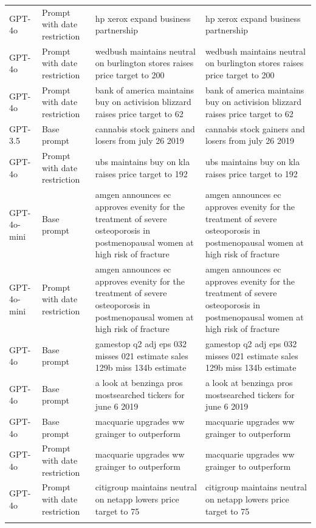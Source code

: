 \begin{longtable}{>{\raggedright\arraybackslash}p{1.4cm}>{\raggedright\arraybackslash}p{1.4cm}>{\raggedright\arraybackslash}p{5.5cm}>{\raggedright\arraybackslash}p{5.5cm}}
GPT-4o & Prompt with date restriction & hp xerox expand business partnership & hp xerox expand business partnership\\
GPT-4o & Prompt with date restriction & wedbush maintains neutral on burlington stores raises price target to 200 & wedbush maintains neutral on burlington stores raises price target to 200\\
GPT-4o & Prompt with date restriction & bank of america maintains buy on activision blizzard raises price target to 62 & bank of america maintains buy on activision blizzard raises price target to 62\\
GPT-3.5 & Base prompt & cannabis stock gainers and losers from july 26 2019 & cannabis stock gainers and losers from july 26 2019\\
GPT-4o & Prompt with date restriction & ubs maintains buy on kla raises price target to 192 & ubs maintains buy on kla raises price target to 192\\
GPT-4o-mini & Base prompt & amgen announces ec approves evenity for the treatment of severe osteoporosis in postmenopausal women at high risk of fracture & amgen announces ec approves evenity for the treatment of severe osteoporosis in postmenopausal women at high risk of fracture\\
GPT-4o-mini & Prompt with date restriction & amgen announces ec approves evenity for the treatment of severe osteoporosis in postmenopausal women at high risk of fracture & amgen announces ec approves evenity for the treatment of severe osteoporosis in postmenopausal women at high risk of fracture\\
GPT-4o & Base prompt & gamestop q2 adj eps 032 misses 021 estimate sales 129b miss 134b estimate & gamestop q2 adj eps 032 misses 021 estimate sales 129b miss 134b estimate\\
GPT-4o & Base prompt & a look at benzinga pros mostsearched tickers for june 6 2019 & a look at benzinga pros mostsearched tickers for june 6 2019\\
GPT-4o & Base prompt & macquarie upgrades ww grainger to outperform & macquarie upgrades ww grainger to outperform\\
GPT-4o & Prompt with date restriction & macquarie upgrades ww grainger to outperform & macquarie upgrades ww grainger to outperform\\
GPT-4o & Prompt with date restriction & citigroup maintains neutral on netapp lowers price target to 75 & citigroup maintains neutral on netapp lowers price target to 75\\*
\end{longtable}
